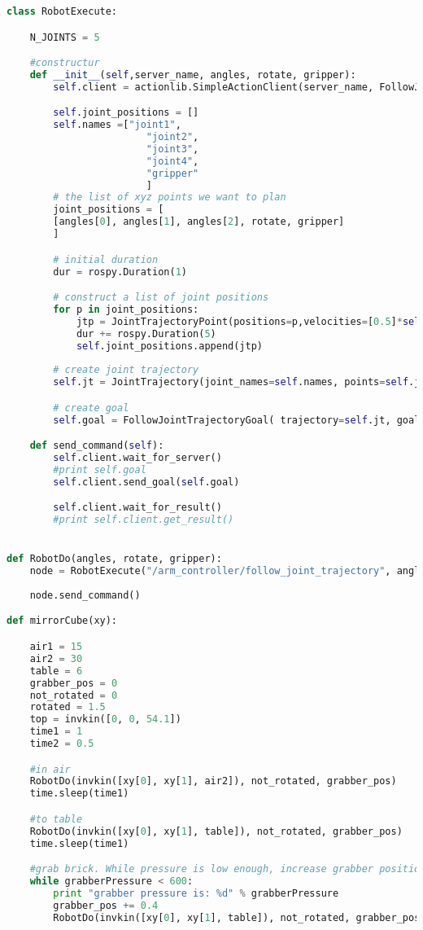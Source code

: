 \begin{lstlisting}[language=Python]
class RobotExecute:

    N_JOINTS = 5

    #constructur
    def __init__(self,server_name, angles, rotate, gripper):
        self.client = actionlib.SimpleActionClient(server_name, FollowJointTrajectoryAction)

        self.joint_positions = []
        self.names =["joint1",
                        "joint2",
                        "joint3",
                        "joint4",
                        "gripper"
                        ]
        # the list of xyz points we want to plan
        joint_positions = [
        [angles[0], angles[1], angles[2], rotate, gripper]
        ]

        # initial duration
        dur = rospy.Duration(1)

        # construct a list of joint positions
        for p in joint_positions:
            jtp = JointTrajectoryPoint(positions=p,velocities=[0.5]*self.N_JOINTS, time_from_start=dur)
            dur += rospy.Duration(5)
            self.joint_positions.append(jtp)
        
        # create joint trajectory
        self.jt = JointTrajectory(joint_names=self.names, points=self.joint_positions)

        # create goal
        self.goal = FollowJointTrajectoryGoal( trajectory=self.jt, goal_time_tolerance=dur+rospy.Duration(2) )

    def send_command(self):
        self.client.wait_for_server()
        #print self.goal
        self.client.send_goal(self.goal)

        self.client.wait_for_result()
        #print self.client.get_result()


def RobotDo(angles, rotate, gripper):   
    node = RobotExecute("/arm_controller/follow_joint_trajectory", angles, rotate, gripper)
    
    node.send_command()

def mirrorCube(xy):

    air1 = 15
    air2 = 30
    table = 6
    grabber_pos = 0
    not_rotated = 0
    rotated = 1.5
    top = invkin([0, 0, 54.1])
    time1 = 1
    time2 = 0.5

    #in air
    RobotDo(invkin([xy[0], xy[1], air2]), not_rotated, grabber_pos)
    time.sleep(time1)

    #to table
    RobotDo(invkin([xy[0], xy[1], table]), not_rotated, grabber_pos)
    time.sleep(time1)

    #grab brick. While pressure is low enough, increase grabber position until brick is secured.
    while grabberPressure < 600:
        print "grabber pressure is: %d" % grabberPressure
        grabber_pos += 0.4
        RobotDo(invkin([xy[0], xy[1], table]), not_rotated, grabber_pos)


\end{lstlisting}
